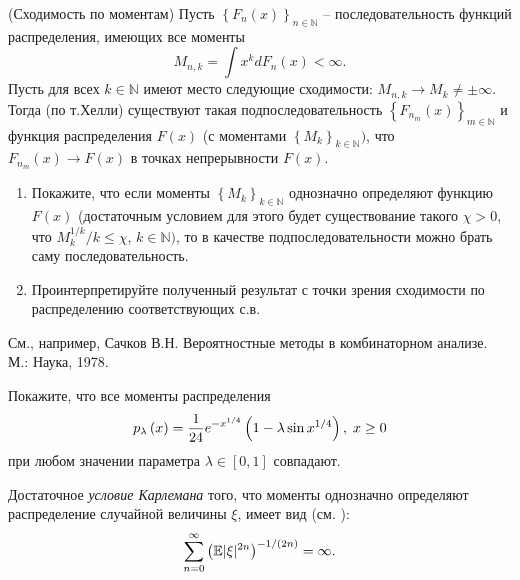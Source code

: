 \begin{problem}(Сходимость по моментам) 
Пусть $\left\{ {F_n \left( x \right)} \right\}_{n\in {\mathbb N}}$ -- последовательность функций  распределения, 
имеющих все моменты 
\[M_{n,k} =\int {x^kdF_n \left( x \right)} <\infty. \] 
Пусть для всех $k\in {\mathbb N}$ имеют место следующие сходимости: $M_{n,k} \to 
M_k \ne \pm \infty $. Тогда (по т.Хелли) существуют такая подпоследовательность $\left\{ 
{F_{n_m } \left( x \right)} \right\}_{m\in {\mathbb N}} $ и функция 
распределения $F\left( x \right)$ (с моментами $\left\{ {M_k } 
\right\}_{k\in {\mathbb N}} )$, что $F_{n_m } \left( x \right)\to F\left( x 
\right)$ в точках непрерывности $F\left( x \right)$.\\

\begin{enumerate}
\item Покажите, что если моменты $\left\{ {M_k } \right\}_{k\in {\mathbb N}} $ 
однозначно определяют функцию $F\left( x \right)$ (достаточным условием для 
этого будет существование такого $\chi >0$, что 
$ M_k^{1/k} / k \leq \chi $, $k\in {\mathbb N})$, то в качестве подпоследовательности можно брать 
саму последовательность.

\item  Проинтерпретируйте полученный результат с точки зрения сходимости по 
распределению соответствующих с.в.
\end{enumerate}
\end{problem}
\begin{remark}
См., например, Сачков В.Н. Вероятностные методы в комбинаторном анализе. М.: Наука, 1978.
\end{remark}

\begin{problem}

Покажите, что все моменты распределения
$$p_{\lambda } \left(x\right)=\frac{1}{24} e^{-x^{{1\mathord{\left/ {\vphantom {1 4}} \right. \kern-\nulldelimiterspace} 4} } } \left(1-\lambda \sin x^{{1\mathord{\left/ {\vphantom {1 4}} \right. \kern-\nulldelimiterspace} 4} } \right),\; x\ge 0$$
при любом значении параметра $\lambda \in \left[0,1\right]$ совпадают.

\begin{remark}

Достаточное \textit{условие Карлемана} того, что моменты однозначно определяют распределение случайной величины $\xi$, имеет вид (см. \cite{stoianov}):
$$
\sum _{n=0}^{\infty }\left(\Exp|\xi|^{2n} \right)^{{-1\mathord{\left/ {\vphantom {-1 \left(2n\right)}} \right. \kern-\nulldelimiterspace} \left(2n\right)} } =\infty.
$$

\end{remark}

\end{problem} 

